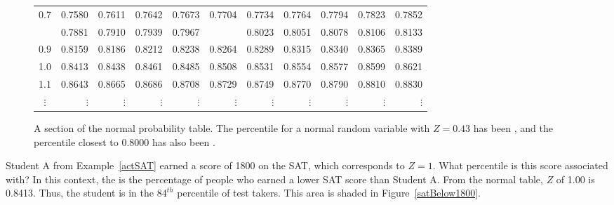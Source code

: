 \begin{figure}
\begin{tabular}{c | rrrrr | rrrrr |}
		0.7 & \scriptsize{0.7580} & \scriptsize{0.7611} & \scriptsize{0.7642} & \scriptsize{0.7673} & \scriptsize{0.7704} & \scriptsize{0.7734} & \scriptsize{0.7764} & \scriptsize{0.7794} & \scriptsize{0.7823} & \scriptsize{0.7852} \\
		\highlightO{0.8} & \scriptsize{0.7881} & \scriptsize{0.7910} & \scriptsize{0.7939} & \scriptsize{0.7967} & \highlightO{\scriptsize{0.7995}} & \scriptsize{0.8023} & \scriptsize{0.8051} & \scriptsize{0.8078} & \scriptsize{0.8106} & \scriptsize{0.8133} \\
		0.9 & \scriptsize{0.8159} & \scriptsize{0.8186} & \scriptsize{0.8212} & \scriptsize{0.8238} & \scriptsize{0.8264} & \scriptsize{0.8289} & \scriptsize{0.8315} & \scriptsize{0.8340} & \scriptsize{0.8365} & \scriptsize{0.8389} \\
		\hline
		\hline
		1.0 & \scriptsize{0.8413} & \scriptsize{0.8438} & \scriptsize{0.8461} & \scriptsize{0.8485} & \scriptsize{0.8508} & \scriptsize{0.8531} & \scriptsize{0.8554} & \scriptsize{0.8577} & \scriptsize{0.8599} & \scriptsize{0.8621} \\
		1.1 & \scriptsize{0.8643} & \scriptsize{0.8665} & \scriptsize{0.8686} & \scriptsize{0.8708} & \scriptsize{0.8729} & \scriptsize{0.8749} & \scriptsize{0.8770} & \scriptsize{0.8790} & \scriptsize{0.8810} & \scriptsize{0.8830} \\
		$\vdots$ &   $\vdots$ &   $\vdots$ &   $\vdots$ &   $\vdots$ &   $\vdots$ &   $\vdots$ &   $\vdots$ &   $\vdots$ &   $\vdots$ &   $\vdots$ \\
		\hline
	\end{tabular}
	\caption{A section of the normal probability table. The percentile for a normal random variable with $Z=0.43$ has been , and the percentile closest to 0.8000 has also been .}
	\label{zTableShort}
\end{figure}

\begin{examplewrap}
\begin{nexample}{Student A from Example~\ref{actSAT} earned a score of 1800 on the SAT, which corresponds to $Z=1$. What percentile is this score associated with?}
In this context, the  is the percentage of people who earned a lower SAT score than Student A. From the normal table, $Z$ of 1.00 is 0.8413. Thus, the student is in the $84^{th}$ percentile of test takers. This area is shaded in Figure~\ref{satBelow1800}.
\end{nexample}
\end{examplewrap}


